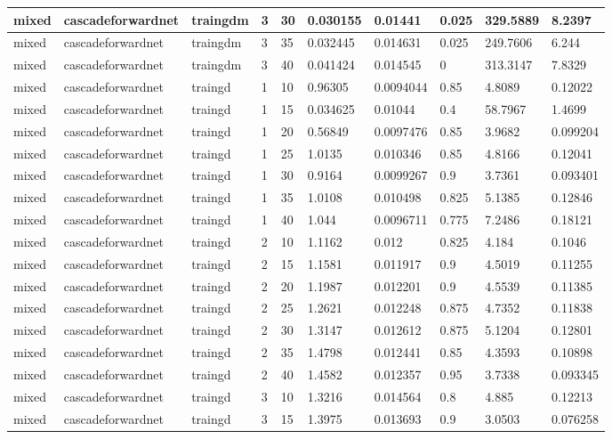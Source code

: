 \begin{longtable}{lllllllll}
mixed & cascadeforwardnet & traingdm & 3 & 30 & 0.030155 & 0.01441 & 0.025 & 329.5889 & 8.2397 \\ \hline 
mixed & cascadeforwardnet & traingdm & 3 & 35 & 0.032445 & 0.014631 & 0.025 & 249.7606 & 6.244 \\ \hline 
mixed & cascadeforwardnet & traingdm & 3 & 40 & 0.041424 & 0.014545 & 0 & 313.3147 & 7.8329 \\ \hline 
mixed & cascadeforwardnet & traingd & 1 & 10 & 0.96305 & 0.0094044 & 0.85 & 4.8089 & 0.12022 \\ \hline 
mixed & cascadeforwardnet & traingd & 1 & 15 & 0.034625 & 0.01044 & 0.4 & 58.7967 & 1.4699 \\ \hline 
mixed & cascadeforwardnet & traingd & 1 & 20 & 0.56849 & 0.0097476 & 0.85 & 3.9682 & 0.099204 \\ \hline 
mixed & cascadeforwardnet & traingd & 1 & 25 & 1.0135 & 0.010346 & 0.85 & 4.8166 & 0.12041 \\ \hline 
mixed & cascadeforwardnet & traingd & 1 & 30 & 0.9164 & 0.0099267 & 0.9 & 3.7361 & 0.093401 \\ \hline 
mixed & cascadeforwardnet & traingd & 1 & 35 & 1.0108 & 0.010498 & 0.825 & 5.1385 & 0.12846 \\ \hline 
mixed & cascadeforwardnet & traingd & 1 & 40 & 1.044 & 0.0096711 & 0.775 & 7.2486 & 0.18121 \\ \hline 
mixed & cascadeforwardnet & traingd & 2 & 10 & 1.1162 & 0.012 & 0.825 & 4.184 & 0.1046 \\ \hline 
mixed & cascadeforwardnet & traingd & 2 & 15 & 1.1581 & 0.011917 & 0.9 & 4.5019 & 0.11255 \\ \hline 
mixed & cascadeforwardnet & traingd & 2 & 20 & 1.1987 & 0.012201 & 0.9 & 4.5539 & 0.11385 \\ \hline 
mixed & cascadeforwardnet & traingd & 2 & 25 & 1.2621 & 0.012248 & 0.875 & 4.7352 & 0.11838 \\ \hline 
mixed & cascadeforwardnet & traingd & 2 & 30 & 1.3147 & 0.012612 & 0.875 & 5.1204 & 0.12801 \\ \hline 
mixed & cascadeforwardnet & traingd & 2 & 35 & 1.4798 & 0.012441 & 0.85 & 4.3593 & 0.10898 \\ \hline 
mixed & cascadeforwardnet & traingd & 2 & 40 & 1.4582 & 0.012357 & 0.95 & 3.7338 & 0.093345 \\ \hline 
mixed & cascadeforwardnet & traingd & 3 & 10 & 1.3216 & 0.014564 & 0.8 & 4.885 & 0.12213 \\ \hline 
mixed & cascadeforwardnet & traingd & 3 & 15 & 1.3975 & 0.013693 & 0.9 & 3.0503 & 0.076258 \\ \hline 

\end{longtable}
